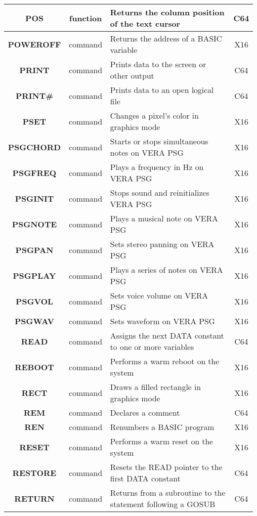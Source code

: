 \begin{longtable}{|c|c|m{4cm}|c|}
	{\bfseries POS} & function & Returns the column position of the text cursor & C64 \\ \hline
	{\bfseries POWEROFF} & command & Returns the address of a BASIC variable & X16 \\ \hline
	{\bfseries PRINT} & command & Prints data to the screen or other output & C64 \\ \hline
	{\bfseries PRINT\#} & command & Prints data to an open logical file & C64 \\ \hline
	{\bfseries PSET} & command & Changes a pixel's color in graphics mode & X16 \\ \hline
	{\bfseries PSGCHORD} & command & Starts or stops simultaneous notes on VERA PSG & X16 \\ \hline
	{\bfseries PSGFREQ} & command & Plays a frequency in Hz on VERA PSG & X16 \\ \hline
	{\bfseries PSGINIT} & command & Stops sound and reinitializes VERA PSG & X16 \\ \hline
	{\bfseries PSGNOTE} & command & Plays a musical note on VERA PSG & X16 \\ \hline
	{\bfseries PSGPAN} & command & Sets stereo panning on VERA PSG & X16 \\ \hline
	{\bfseries PSGPLAY} & command & Plays a series of notes on VERA PSG & X16 \\ \hline
	{\bfseries PSGVOL} & command & Sets voice volume on VERA PSG & X16 \\ \hline
	{\bfseries PSGWAV} & command & Sets waveform on VERA PSG & X16 \\ \hline
	{\bfseries READ} & command & Assigns the next {\ttfamily DATA} constant to one or more variables & C64 \\ \hline
	{\bfseries REBOOT} & command & Performs a warm reboot on the system & X16 \\ \hline
	{\bfseries RECT} & command & Draws a filled rectangle in graphics mode & X16 \\ \hline
	{\bfseries REM} & command & Declares a comment & C64 \\ \hline
	{\bfseries REN} & command & Renumbers a BASIC program & X16 \\ \hline
	{\bfseries RESET} & command & Performs a warm reset on the system & X16 \\ \hline
	{\bfseries RESTORE} & command & Resets the {\ttfamily READ} pointer to the first {\ttfamily DATA} constant & C64 \\ \hline
	{\bfseries RETURN} & command & Returns from a subroutine to the statement following a GOSUB & C64 \\ \hline

\end{longtable}
